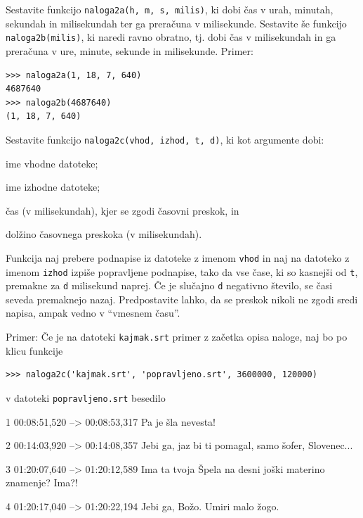 \documentclass[arhiv]{../izpit}
\begin{document}
\podnaloga[15 točk]
Sestavite funkcijo \texttt{naloga2a(h, m, s, milis)}, ki dobi čas v urah, minutah, sekundah in milisekundah ter ga preračuna v milisekunde. Sestavite še funkcijo \texttt{naloga2b(milis)},
ki naredi ravno obratno, tj. dobi čas v milisekundah in ga preračuna v ure, minute, sekunde in milisekunde. Primer:
\begin{verbatim}
>>> naloga2a(1, 18, 7, 640)
4687640
>>> naloga2b(4687640)
(1, 18, 7, 640)
\end{verbatim}

\podnaloga[20 točk]
Sestavite funkcijo \texttt{naloga2c(vhod, izhod, t, d)}, ki kot argumente dobi:
\begin{compactitem}
\item ime vhodne datoteke;
\item ime izhodne datoteke;
\item čas (v milisekundah), kjer se zgodi časovni preskok, in
\item dolžino časovnega preskoka (v milisekundah).
\end{compactitem}
Funkcija naj prebere podnapise iz datoteke z imenom \verb+vhod+ in naj na datoteko z imenom \verb+izhod+ izpiše popravljene podnapise, tako da
vse čase, ki so kasnejši od \verb+t+, premakne za \verb+d+ milisekund naprej. Če je slučajno
\verb+d+ negativno število, se časi seveda premaknejo nazaj. Predpostavite lahko, da se preskok nikoli ne zgodi sredi napisa, ampak vedno v ``vmesnem času''.

Primer: Če je na datoteki \texttt{kajmak.srt} primer z začetka opisa naloge, naj bo po klicu funkcije
%
\begin{verbatim}
>>> naloga2c('kajmak.srt', 'popravljeno.srt', 3600000, 120000)
\end{verbatim}
%
v datoteki \texttt{popravljeno.srt} besedilo
\begin{verbatim*}
1
00:08:51,520 --> 00:08:53,317
Pa je šla nevesta!

2
00:14:03,920 --> 00:14:08,357
Jebi ga, jaz bi ti pomagal,
samo šofer, Slovenec...

3
01:20:07,640 --> 01:20:12,589
Ima ta tvoja Špela na desni
joški materino znamenje? Ima?!

4
01:20:17,040 --> 01:20:22,194
Jebi ga, Božo.
Umiri malo žogo.
\end{verbatim*}

\newpage

\end{document}
